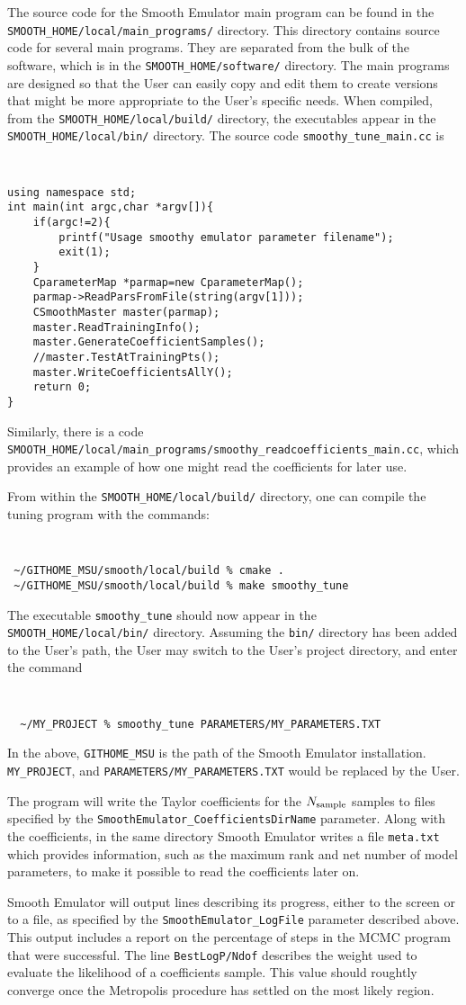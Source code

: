 \documentclass[main.tex]{subfiles}
\begin{document}
The source code for the Smooth Emulator main program can be found in the {\tt SMOOTH\_HOME/local/main\_programs/} directory. This directory contains source code for several main programs. They are separated from the bulk of the software, which is in the {\tt SMOOTH\_HOME/software/} directory. The main programs are designed so that the User can easily copy and edit them to create versions that might be more appropriate to the User's specific needs. When compiled, from the {\tt SMOOTH\_HOME/local/build/} directory, the executables appear in the {\tt SMOOTH\_HOME/local/bin/} directory. The source code {\tt smoothy\_tune\_main.cc} is
{\tt
\begin{verbatim}
using namespace std;
int main(int argc,char *argv[]){
    if(argc!=2){
        printf("Usage smoothy emulator parameter filename");
        exit(1);
    }
    CparameterMap *parmap=new CparameterMap();
    parmap->ReadParsFromFile(string(argv[1]));
    CSmoothMaster master(parmap);
    master.ReadTrainingInfo();
    master.GenerateCoefficientSamples();
    //master.TestAtTrainingPts();
    master.WriteCoefficientsAllY();
    return 0;
}
\end{verbatim}
}
Similarly, there is a code {\tt SMOOTH\_HOME/local/main\_programs/smoothy\_readcoefficients\_main.cc}, which provides an example of how one might read the coefficients for later use.

From within the {\tt SMOOTH\_HOME/local/build/} directory, one can compile the tuning program with the commands:
{\tt
\begin{verbatim}
 ~/GITHOME_MSU/smooth/local/build % cmake .
 ~/GITHOME_MSU/smooth/local/build % make smoothy_tune
\end{verbatim}
}
The executable {\tt smoothy\_tune} should now appear in the {\tt SMOOTH\_HOME/local/bin/} directory. Assuming the {\tt bin/} directory has been added to the User's path, the User may switch to the User's project directory, and enter the command
{\tt
\begin{verbatim}
  ~/MY_PROJECT % smoothy_tune PARAMETERS/MY_PARAMETERS.TXT
\end{verbatim}
}
In the above, {\tt GITHOME\_MSU} is the path of the Smooth Emulator installation. {\tt MY\_PROJECT}, and {\tt PARAMETERS/MY\_PARAMETERS.TXT} would be replaced by the User.

The program will write the Taylor coefficients for the $N_{\rm sample}$ samples to files specified by the {\tt SmoothEmulator\_CoefficientsDirName} parameter.  Along with the coefficients, in the same directory Smooth Emulator writes a file {\tt meta.txt} which provides information, such as the maximum rank and net number of model parameters, to make it possible to read the coefficients later on.

Smooth Emulator will output lines describing its progress, either to the screen or to a file, as specified by the {\tt SmoothEmulator\_LogFile} parameter described above. This output includes a report on the percentage of steps in the MCMC program that were successful. The line {\tt BestLogP/Ndof} describes the weight used to evaluate the likelihood of a coefficients sample. This value should roughtly converge once the Metropolis procedure has settled on the most likely region. 
\end{document}
